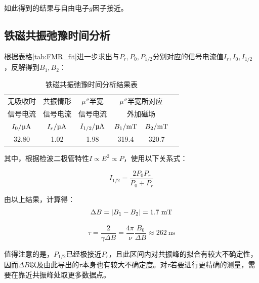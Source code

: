 \documentclass{thuemp}
\begin{document}
如此得到的结果与自由电子$g$因子接近。

\subsection{铁磁共振弛豫时间分析}

根据表格\ref{tab:FMR_fit}进一步求出与$P_r, P_0, P_{1/2}$分别对应的信号电流值$I_r, I_0, I_{1/2}$，反解得到$B_{1}, B_{2}$：

\begin{table}[H]
    \centering
    \captionnamefont{\wuhao\bf\heiti}
    \captiontitlefont{\wuhao\bf\heiti}
    \caption{铁磁共振弛豫时间分析结果表} \label{tab:FMR_relax}
    \liuhao
    \begin{tabular}{cccccc}
        \toprule
        无吸收时 & 共振情形 & $\mu''$半宽 &
            \multicolumn{2}{c}{$\mu''$半宽所对应}\\
        信号电流 & 信号电流 & 信号电流     &  
            \multicolumn{2}{c}{外加磁场}\\
        $I_{0}/\text{\si{\micro\ampere}}$ & 
            $I_{r}/\text{\si{\micro\ampere}}$ &
            $I_{1/2}/\text{\si{\micro\ampere}}$&
            $B_1/\text{\si{\milli\tesla}}$ &
            $B_2/\text{\si{\milli\tesla}}$ \\ 
        \midrule
        32.80& 1.02 & 1.98 & 319.4 & 320.7 \\
        \bottomrule
    \end{tabular}
\end{table}

其中，根据检波二极管特性$I \propto E^2 \propto P$，使用以下关系式：

\begin{equation}
    I_{1/2} = \frac{2P_0P_r}{P_0+P_r}
\end{equation}

由以上结果，计算得：
\begin{equation}
    \Delta B = |B_1 - B_2| = 1.7 ~\text{\si{\milli\tesla}}
\end{equation}

\begin{equation}
    \tau = \frac{2}{\gamma\Delta B}
         = \frac{4\pi}{\nu}\frac{B_0}{\Delta B}
         \approx 262 ~ \text{ns}
\end{equation}

值得注意的是，$P_{1/2}$已经极接近$P_r$，且此区间内对共振峰的拟合有较大不确定性，因而$\Delta B$以及由此导出的$\tau$本身也有较大不确定度。对$\tau$若要进行更精确的测量，需要在靠近共振峰处取更多数据点。
\end{document}
